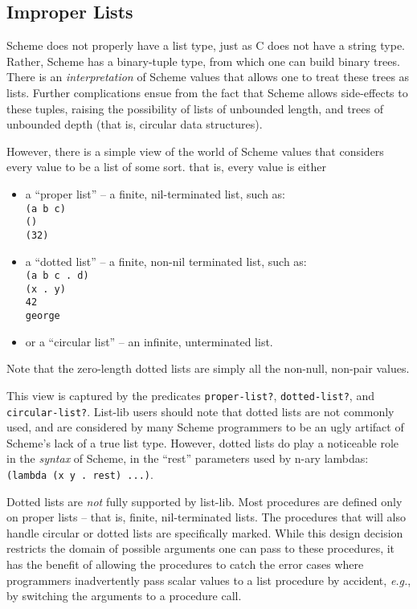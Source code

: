 \subsection{{Improper Lists}}\label{improper-lists}

Scheme does not properly have a list type, just as C does not have a
string type. Rather, Scheme has a binary-tuple type, from which one can
build binary trees. There is an \emph{interpretation} of Scheme values
that allows one to treat these trees as lists. Further complications
ensue from the fact that Scheme allows side-effects to these tuples,
raising the possibility of lists of unbounded length, and trees of
unbounded depth (that is, circular data structures).

However, there is a simple view of the world of Scheme values that
considers every value to be a list of some sort. that is, every value is
either

\begin{itemize}
\tightlist
\item
  a ``proper list'' -- a finite, nil-terminated list, such as:\\
  \texttt{(a\ b\ c)}\\
  \texttt{()}\\
  \texttt{(32)}\\
\item
  a ``dotted list'' -- a finite, non-nil terminated list, such as:\\
  \texttt{(a\ b\ c\ .\ d)}\\
  \texttt{(x\ .\ y)}\\
  \texttt{42}\\
  \texttt{george}\\
\item
  or a ``circular list'' -- an infinite, unterminated list.
\end{itemize}

Note that the zero-length dotted lists are simply all the non-null,
non-pair values.

This view is captured by the predicates \texttt{proper-list?},
\texttt{dotted-list?}, and \texttt{circular-list?}. List-lib users
should note that dotted lists are not commonly used, and are considered
by many Scheme programmers to be an ugly artifact of Scheme's lack of a
true list type. However, dotted lists do play a noticeable role in the
\emph{syntax} of Scheme, in the ``rest'' parameters used by n-ary
lambdas: \texttt{(lambda\ (x\ y\ .\ rest)\ ...)}.

Dotted lists are \emph{not} fully supported by list-lib. Most procedures
are defined only on proper lists -- that is, finite, nil-terminated
lists. The procedures that will also handle circular or dotted lists are
specifically marked. While this design decision restricts the domain of
possible arguments one can pass to these procedures, it has the benefit
of allowing the procedures to catch the error cases where programmers
inadvertently pass scalar values to a list procedure by accident,
\emph{e.g.}, by switching the arguments to a procedure call.


